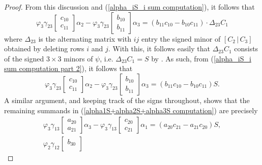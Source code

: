 \documentclass[reqno]{amsart}
\numberwithin{equation}{section}
\theoremstyle{definition}
\begin{document}
\begin{proof}
From this discussion and (\ref{alpha_iS_i sum computation}), it follows that 
\begin{equation}\label{alpha_iS_i sum computation part 2}
 \varphi_3\gamma_{23}\begin{bmatrix}
                 c_{10}\\
                 c_{11}
             \end{bmatrix}\alpha_2 -
             \varphi_3\gamma_{23}\begin{bmatrix}
                 b_{10}\\
                 b_{11}
             \end{bmatrix} \alpha_3 = (b_{11}c_{10}-b_{10}c_{11})\cdot \Delta_{23}C_1
\end{equation}
where $\Delta_{23}$ is the alternating matrix with $ij$ entry the signed minor of $[C_2\,|\,C_3]$ obtained by deleting rows $i$ and $j$. With this, it follows easily that $\Delta_{23}C_1$ consists of the signed $3\times 3$ minors of $\psi$, i.e. $\Delta_{23}C_1 =S$ by . As such, from (\ref{alpha_iS_i sum computation part 2}), it follows that 
\[
\varphi_3\gamma_{23}\begin{bmatrix}
                 c_{10}\\
                 c_{11}
             \end{bmatrix}\alpha_2 -
             \varphi_3\gamma_{23}\begin{bmatrix}
                 b_{10}\\
                 b_{11}
             \end{bmatrix} \alpha_3 = (b_{11}c_{10}-b_{10}c_{11}) S.
\]
A similar argument, and keeping track of the signs throughout, shows that the remaining summands in (\ref{alpha1S+alpha2S+alpha3S computation}) are precisely
\[
\begin{array}{l}
\varphi_3\gamma_{13}\begin{bmatrix}
                 a_{20}\\
                 a_{21}
             \end{bmatrix}\alpha_3
             -\varphi_3\gamma_{13}\begin{bmatrix}
                 c_{20}\\
                 c_{21}
             \end{bmatrix} \alpha_1  = (a_{20}c_{21}-a_{21}c_{20})S, \\[3ex]
\varphi_2\gamma_{12}\begin{bmatrix}
                 b_{30}\\

\end{bmatrix}
\end{array}\]
\end{proof}
\end{document}
